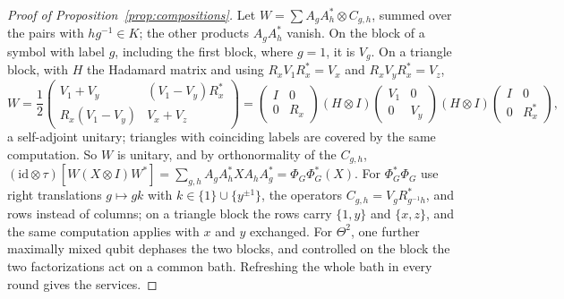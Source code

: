 \begin{proof}[Proof of Proposition~\ref{prop:compositions}]
Let $W=\sum A_gA_h^*\otimes C_{g,h}$, summed over the pairs with $hg^{-1}\in K$; the other products $A_gA_h^*$ vanish. On the block of a symbol
with label $g$, including the first block, where $g=1$, it is $V_g$. On a triangle block, with $H$ the Hadamard matrix and using
$R_xV_1R_x^*=V_x$ and $R_xV_yR_x^*=V_z$,
\[
W=\frac12\begin{pmatrix}V_1+V_y&(V_1-V_y)R_x^*\\ R_x(V_1-V_y)&V_x+V_z\end{pmatrix}
=\begin{pmatrix}I&0\\0&R_x\end{pmatrix}(H\otimes I)\begin{pmatrix}V_1&0\\0&V_y\end{pmatrix}(H\otimes I)\begin{pmatrix}I&0\\0&R_x^*\end{pmatrix},
\]
a self-adjoint unitary; triangles with coinciding labels are covered by the same computation. So $W$ is unitary, and by orthonormality of the
$C_{g,h}$, $(\mathrm{id}\otimes\tau)[W(X\otimes I)W^*]=\sum_{g,h}A_gA_h^*XA_hA_g^*=\Phi_G\Phi_G^*(X)$. For $\Phi_G^*\Phi_G$ use right translations
$g\mapsto gk$ with $k\in\{1\}\cup\{y^{\pm1}\}$, the operators $C_{g,h}=V_gR_{g^{-1}h}^*$, and rows instead of columns; on a triangle block the rows carry
$\{1,y\}$ and $\{x,z\}$, and the same computation applies with $x$ and $y$ exchanged. For $\Theta^2$, one further maximally mixed qubit dephases the
two blocks, and controlled on the block the two factorizations act on a common bath. Refreshing the whole bath in every round gives the services.
\end{proof}
